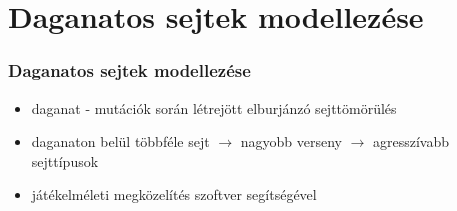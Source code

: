 \section{Daganatos sejtek modellezése}
\begin{frame}
\frametitle{Daganatos sejtek modellezése}
\begin{itemize}
	\item daganat - mutációk során létrejött elburjánzó sejttömörülés
	\item daganaton belül többféle sejt $\rightarrow$ nagyobb verseny $\rightarrow$ agresszívabb sejttípusok
	\item játékelméleti megközelítés szoftver segítségével
\end{itemize}

\end{frame}

\iffalse
\begin{frame}
	\frametitle{Daganatos sejtek modellezése}
	Lehetséges modellek:
	\begin{itemize}
		\item daganatos sejtek - erőforrásokért folyatott \textbf{verseny}
		\item növekedési faktorokat termelő egészséges sejtek és daganatos sejtek - \textbf{parazitizmus}
		\item immunsejtek - \textbf{ragadozó}
		\item egészséges sejtek, daganatos sejtek - \textbf{mutualizmnus}
	\end{itemize}
	\begin{figure}
		\centering
		\begin{tikzpicture}
		\node[anchor=south west,inner sep=0] (image) at (4,0) { \texttt{[image: images/models]}};
		\pause
		\begin{scope}[x={(image.south east)},y={(image.north west)}]
		\draw[red,ultra thick,rounded corners] (0.15,0.6) rectangle (0.28,1);
		\end{scope}
		\end{tikzpicture}
	\end{figure}
\end{frame}
\fi

